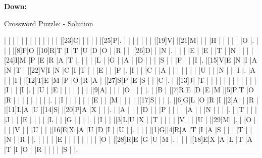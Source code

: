 \documentclass[12pt]{article}
\begin{document}
\begin{PuzzleClues}{\textbf{Down:}}
\end{PuzzleClues}
\newpage
\begin{center}
  \huge{Crossword Puzzle: - Solution}
\end{center}
\vspace{1.5cm}
\PuzzleSolution
\begin{Puzzle}{21}{21}
  |{}  |{}  |{}  |{}  |{}  |{}  |{}  |{}  |{}  |{}  |{}  |{}  |{}  |[23]C|{}  |{}  |{}  |{}  |{}  |[25]P|.
  |{}  |{}  |{}  |{}  |{}  |{}  |{}  |[19]V|{}  |[21]M|{}  |{}  |{}  |H   |{}  |{}  |{}  |{}  |{}  |O   |.
  |{}  |{}  |{}  |[8]F|O   |[10]R|T   |I   |T   |U   |D   |O   |{}  |R   |{}  |{}  |[26]D|{}  |{}  |N   |.
  |{}  |{}  |{}  |E   |{}  |E   |{}  |T   |{}  |N   |{}  |{}  |{}  |[24]I|M   |P   |E   |R   |A   |T   |.
  |{}  |{}  |{}  |L   |{}  |G   |{}  |A   |{}  |D   |{}  |{}  |{}  |S   |{}  |{}  |F   |{}  |{}  |I   |.
  |[15]V|E   |N   |I   |A   |N   |T   |{}  |[22]V|I   |N   |C   |I   |T   |{}  |{}  |E   |{}  |{}  |F   |.
  |I   |{}  |{}  |C   |{}  |A   |{}  |{}  |{}  |{}  |{}  |{}  |{}  |U   |{}  |{}  |N   |{}  |{}  |I   |.
  |A   |{}  |{}  |I   |{}  |[12]T|E   |M   |P   |O   |R   |A   |{}  |[27]S|P   |E   |S   |{}  |{}  |C   |.
  |{}  |[13]J|{}  |T   |{}  |{}  |{}  |{}  |{}  |{}  |{}  |{}  |{}  |{}  |{}  |{}  |I   |{}  |{}  |I   |.
  |{}  |U   |{}  |E   |{}  |{}  |{}  |{}  |{}  |{}  |{}  |[9]A|{}  |{}  |{}  |{}  |O   |{}  |{}  |{}  |.
  |{}  |B   |{}  |[7]R|E   |D   |E   |M   |[5]P|T   |O   |R   |{}  |{}  |{}  |{}  |{}  |{}  |{}  |{}  |.
  |{}  |I   |{}  |{}  |{}  |{}  |{}  |{}  |E   |{}  |{}  |M   |{}  |{}  |{}  |{}  |[17]S|{}  |{}  |{}  |.
  |[6]G|L   |O   |R   |I   |[2]A|{}  |{}  |R   |{}  |[11]L|A   |U   |[14]S|{}  |[20]P|A   |X   |{}  |{}  |.
  |{}  |A   |{}  |{}  |{}  |D   |{}  |{}  |P   |{}  |{}  |{}  |{}  |A   |{}  |{}  |N   |{}  |{}  |{}  |.
  |{}  |T   |{}  |{}  |{}  |J   |{}  |{}  |E   |{}  |{}  |{}  |{}  |L   |{}  |{}  |G   |{}  |{}  |{}  |.
  |{}  |I   |{}  |{}  |[3]L|U   |X   |{}  |T   |{}  |{}  |{}  |{}  |V   |{}  |{}  |U   |{}  |[29]M|{}  |.
  |{}  |O   |{}  |{}  |{}  |V   |{}  |{}  |U   |{}  |{}  |[16]E|X   |A   |U   |D   |I   |{}  |U   |{}  |.
  |{}  |{}  |{}  |[1]G|[4]R|A   |T   |I   |A   |S   |{}  |{}  |{}  |T   |{}  |{}  |N   |{}  |R   |{}  |.
  |{}  |{}  |{}  |{}  |E   |{}  |{}  |{}  |{}  |{}  |{}  |{}  |{}  |O   |{}  |[28]R|E   |G   |U   |M   |.
  |{}  |{}  |{}  |[18]E|X   |A   |L   |T   |A   |T   |I   |O   |{}  |R   |{}  |{}  |{}  |{}  |S   |{}  |.
\end{Puzzle}
\end{document}
